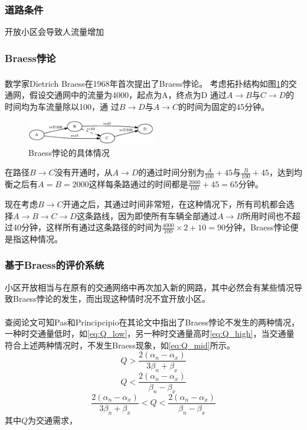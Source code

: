 \documentclass[fontset=windows,a4paper,12pt]{ctexart}
\newcommand{\upcite}[1]{\textsuperscript{\textsuperscript{\cite{#1}}}}
\begin{document}
		\subsubsection{道路条件}
			开放小区会导致人流量增加
		\subsubsection{Braess悖论}
			数学家Dietrich Braess在1968年首次提出了Braess悖论\upcite{Braess1968Ü}。
			考虑拓扑结构如图\ref{fig:braess}的交通网，假设交通网中的流量为4000，起点为A，终点为D
			通过$ A \rightarrow B $与$ C \rightarrow D $的时间均为车流量除以100，通
			过$ B \rightarrow D $与$ A \rightarrow C $的时间为固定的45分钟。
			\begin{figure}[!htbp]
				\centering
				\includegraphics[width=0.5\textwidth]{pic/braess.eps}
				\caption{Braess悖论的具体情况}
				\label{fig:braess}
			\end{figure}
			在路径$ B \rightarrow C $没有开通时，从$ A \rightarrow D $的通过时间分别为$ \frac{A}{100}+45 $与$ \frac{B}
			{100} + 45 $，达到均衡之后有$ A=B=2000 $这样每条路通过的时间都是$ \frac{2000}{100}
			+45=65 $分钟。
			
			现在考虑$ B \rightarrow C $开通之后，其通过时间非常短，在这种情况下，所有司机都会选择$ A \rightarrow B \rightarrow C \rightarrow D $这条路线，因为即使所有车辆全部通过$ A \rightarrow B $所用时间也不超过40分钟，这样所有通过这条路径的时间为$ \frac{4000}{100}\times 2+10=90$分钟，Braess悖论便是指这种情况。
		\subsubsection{基于Braess的评价系统}
			小区开放相当与在原有的交通网络中再次加入新的网路，其中必然会有某些情况导致Braess悖论的发生，而出现这种情时况不宜开放小区。
			
			查阅论文可知Pas和Principcipio在其论文中指出了Braess悖论不发生的两种情况\upcite{pas1997braess}，一种时交通量低时，如\ref{eq:Q_low}，另一种时交通量高时\ref{eq:Q_high}，当交通量符合上述两种情况时，不发生Braess现象，如\ref{eq:Q_mid}所示。
			\begin{equation}
				Q>\frac{2(\alpha_n-\alpha_x)}{3\beta_n+\beta_x}
				\label{eq:Q_low}
			\end{equation}
			\begin{equation}
				Q<\frac{2(\alpha_n-\alpha_x)}{\beta_n-\beta_x}
				\label{eq:Q_high}
			\end{equation}
			\begin{equation}
				\frac{2(\alpha_n-\alpha_x)}{3\beta_n+\beta_x}<Q<\frac{2(\alpha_n-\alpha_x)}{\beta_n-\beta_x}
				\label{eq:Q_mid}
			\end{equation}
			其中$ Q $为交通需求，
\end{document}
